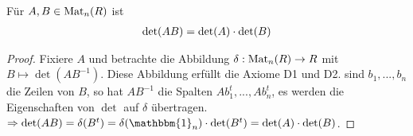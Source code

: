 \begin{theorem}[Determinantenmultiplikationssatz]
	Für $A,B\in \operatorname{Mat}_n(R)$ ist 
	\begin{align}
		\det(AB)=\det(A)\cdot \det(B)\notag
	\end{align}
\end{theorem}
\begin{proof}
	Fixiere $A$ und betrachte die Abbildung $\delta: \operatorname{Mat}_n(R)\to R$ mit $B\mapsto \det(AB^{-1})$. Diese Abbildung erfüllt die Axiome 
	D1 und D2. sind $b_1,...,b_n$ die Zeilen von $B$, so hat $AB^{-1}$ die Spalten $Ab_1^t,...,Ab_n^t$, es werden die Eigenschaften 
	von $\det$ auf $\delta$ übertragen. \\
	$\Rightarrow \det(AB)=\delta(B^t)=\delta(\mathbbm{1}_n)\cdot \det(B^t)=\det(A)\cdot \det(B)$.
\end{proof}